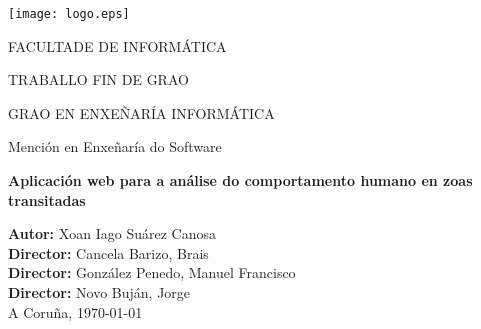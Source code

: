 \begin{titlepage}
\begin{center}

\texttt{[image: logo.eps]}

\vspace{0.5cm}
FACULTADE DE INFORMÁTICA

\vspace*{1cm}

\Large{TRABALLO FIN DE GRAO}

\Large{GRAO EN ENXEÑARÍA INFORMÁTICA}

Mención en Enxeñaría do Software

\vspace*{2cm}

\textbf{\LARGE{Aplicación web para a análise do comportamento humano en zoas transitadas}}

\end{center}

\vspace*{4cm}

\begin{flushright}
\large{
\textbf{Autor:} Xoan Iago Suárez Canosa\\
\textbf{Director:} Cancela Barizo, Brais \\
\textbf{Director:} González Penedo, Manuel Francisco \\
\textbf{Director:} Novo Buján, Jorge \\
\vspace{0.5cm}
A Coruña, \today}
\end{flushright}

\end{titlepage}
